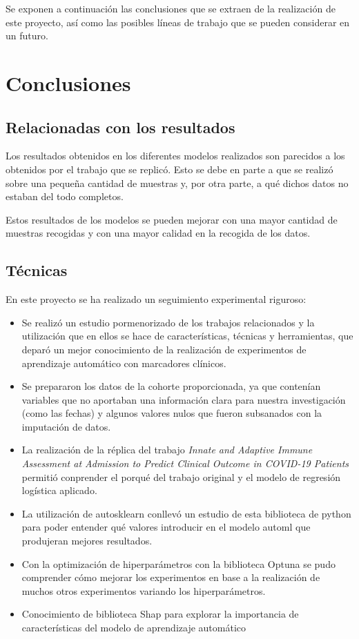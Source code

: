 
Se exponen a continuación las conclusiones que se extraen de la realización de este proyecto, así como las posibles líneas de trabajo que se pueden considerar en un futuro.

\section{Conclusiones}

\subsection{Relacionadas con los resultados}

Los resultados obtenidos en los diferentes modelos realizados son parecidos a los obtenidos por el trabajo que se replicó. Esto se debe en parte a que se realizó sobre una pequeña cantidad de muestras y, por otra parte, a qué dichos datos no estaban del todo completos.

Estos resultados de los modelos se pueden mejorar con una mayor cantidad de muestras recogidas y con una mayor calidad en la recogida de los datos.

\subsection{Técnicas}
En este proyecto se ha realizado un seguimiento experimental riguroso:
\begin{itemize}
    \item Se realizó un estudio pormenorizado de los trabajos relacionados y la utilización que en ellos se hace de características, técnicas y herramientas, que deparó un mejor conocimiento de la realización de experimentos de aprendizaje automático con marcadores clínicos.
    \item Se prepararon los datos de la cohorte proporcionada, ya que contenían variables que no aportaban una información clara para nuestra investigación (como las fechas) y algunos valores nulos que fueron subsanados con la imputación de datos.
    \item La realización de la réplica del trabajo \textit{Innate and Adaptive Immune Assessment at Admission to Predict Clinical Outcome in COVID-19 Patients}\cite{sansegundo:2021} permitió conprender el porqué del trabajo original y el modelo de regresión logística aplicado.
    \item La utilización de autosklearn conllevó un estudio de esta biblioteca de python para poder entender qué valores introducir en el modelo automl que produjeran mejores resultados.
    \item Con la optimización de hiperparámetros con la biblioteca Optuna se pudo comprender cómo mejorar los experimentos en base a la realización de muchos otros experimentos variando los hiperparámetros.
    \item Conocimiento de biblioteca Shap para explorar la importancia de características del modelo de aprendizaje automático
\end{itemize}

